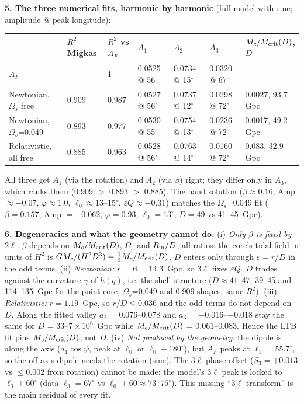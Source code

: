 \documentclass[10pt]{article}
\begin{document}
{\textbf{5. The three numerical fits, harmonic by harmonic} (full model with sine; amplitude @ peak longitude):
\begin{center}\footnotesize\setlength{\tabcolsep}{4pt}\begin{tabular}{lllllll}\toprule
 & $R^2$ Migkas & $R^2$ vs $A_F$ & $A_1$ & $A_2$ & $A_3$ & $M_c/M_{\rm crit}(D)$, $D$\\\midrule
$A_F$ & -- & 1 & 0.0525 @ 56$^\circ$ & 0.0734 @ 15$^\circ$ & 0.0320 @ 67$^\circ$ & --\\
Newtonian, $\Omega_s$ free & 0.909 & 0.987 & 0.0527 @ 56$^\circ$ & 0.0737 @ 12$^\circ$ & 0.0298 @ 72$^\circ$ & 0.0027, 93.7 Gpc\\
Newtonian, $\Omega_s$=0.049 & 0.893 & 0.977 & 0.0530 @ 55$^\circ$ & 0.0754 @ 13$^\circ$ & 0.0236 @ 72$^\circ$ & 0.0017, 49.2 Gpc\\
Relativistic, all free & 0.885 & 0.963 & 0.0528 @ 56$^\circ$ & 0.0763 @ 14$^\circ$ & 0.0160 @ 72$^\circ$ & 0.083, 32.9 Gpc\\\bottomrule
\end{tabular}\end{center}
\vspace{-4pt}
All three get $A_1$ (via the rotation) and $A_2$ (via $\beta$) right; they differ only in $A_3$, which ranks them (0.909 $>$ 0.893 $>$ 0.885). The hand solution ($\beta\approx0.16$, Amp $\approx-0.07$, $\varphi\approx1.0$, $\ell_0\approx13$--15$^\circ$, $\varepsilon Q\approx-0.31$) matches the $\Omega_s$=0.049 fit ($\beta=0.157$, Amp $=-0.062$, $\varphi=0.93$, $\ell_0=13^\circ$, $D=49$ vs 41--45~Gpc).

\textbf{6. Degeneracies and what the geometry cannot do.}
(i) \emph{Only $\beta$ is fixed by $2\ell$.} $\beta$ depends on $M_c/M_{\rm crit}(D)$, $\Omega_s$ and $R_{\rm in}/D$, all ratios: the core's tidal field in units of $H^2$ is $GM_c/(H^2D^3)=\frac12M_c/M_{\rm crit}(D)$. $D$ enters only through $\varepsilon=r/D$ in the odd terms.
(ii) \emph{Newtonian:} $r=R=14.3$~Gpc, so $3\ell$ fixes $\varepsilon Q$. $D$ trades against the curvature $\gamma$ of $h(q)$, i.e. the shell structure ($D\approx41$--47, 39--45 and 114--135~Gpc for the point-core, $\Omega_s$=0.049 and 0.909 shapes, same $R^2$).
(iii) \emph{Relativistic:} $r=1.19$~Gpc, so $r/D\le0.036$ and the odd terms do not depend on $D$. Along the fitted valley $a_2$ = 0.076--0.078 and $a_3$ = $-$0.016--$-$0.018 stay the same for $D$ = 33--$7\times10^6$~Gpc while $M_c/M_{\rm crit}(D)$ = 0.061--0.083. Hence the LTB fit pins $M_c/M_{\rm crit}(D)$, not $D$.
(iv) \emph{Not produced by the geometry:} the dipole is along the axis ($a_1\cos\psi$, peak at $\ell_0$ or $\ell_0+180^\circ$), but $A_F$ peaks at $\ell_1=55.7^\circ$, so the off-axis dipole needs the rotation (sine). The $3\ell$ phase offset ($S_3=+0.013$ vs $\le0.002$ from rotation) cannot be made: the model's $3\ell$ peak is locked to $\ell_0+60^\circ$ (data $\ell_3=67^\circ$ vs $\ell_0+60\approx73$--$75^\circ$). This missing ``$3\ell$ transform'' is the main residual of every fit.


}
\end{document}
